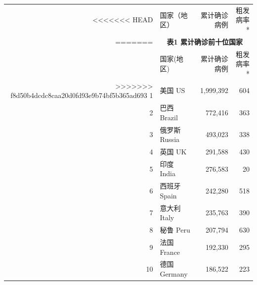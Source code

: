\documentclass[
]{article}
\begin{document}
\begin{table}[H]
    \centering \begin{table}[H]
\centering\begingroup\fontsize{20}{22}\selectfont

\begin{tabular}{rlrr}
\toprule
<<<<<<< HEAD
  & 国家（地区） & 累计确诊病例 & 粗发病率*\\
=======
\multicolumn{0}{c}{\textbf{ }} & \multicolumn{3}{c}{\textbf{表1 累计确诊前十位国家}} \\
  & 国家(地区) & 累计确诊病例 & 粗发病率*\\
>>>>>>> f8d50b4dcdc8caa20d0fd93e9b74bf5b365ad693
\midrule
\rowcolor{gray!6}  1 & 美国 US & 1,999,392 & 604\\
2 & 巴西 Brazil & 772,416 & 363\\
\rowcolor{gray!6}  3 & 俄罗斯 Russia & 493,023 & 338\\
4 & 英国 UK & 291,588 & 430\\
\rowcolor{gray!6}  5 & 印度 India & 276,583 & 20\\
6 & 西班牙 Spain & 242,280 & 518\\
\rowcolor{gray!6}  7 & 意大利 Italy & 235,763 & 390\\
8 & 秘鲁 Peru & 207,794 & 630\\
\rowcolor{gray!6}  9 & 法国 France & 192,330 & 295\\
10 & 德国 Germany & 186,522 & 223\\
\bottomrule
\end{tabular}
\endgroup{}
\end{table} \end{table}\begin{table}[H]
    \centering \begin{table}[H]
\centering\begingroup\fontsize{20}{22}\selectfont


\end{table}
\end{table}
\end{document}
